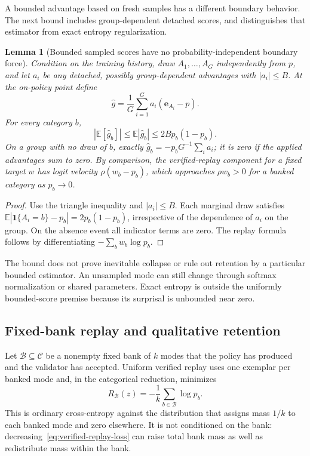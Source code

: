\documentclass{article}
\newcommand{\1}{\mathbf 1}
\newcommand{\E}{\mathbb E}
\newtheorem{lemma}{Lemma}[section]
\theoremstyle{remark}
\theoremstyle{definition}
\theoremstyle{plain}
\begin{document}
A bounded advantage based on fresh samples has a different boundary behavior.
The next bound includes group-dependent detached scores, and distinguishes
that estimator from exact entropy regularization.

\begin{lemma}[Bounded sampled scores have no probability-independent boundary force]
\label{lem:sampled-score-bound}
Condition on the training history, draw $A_1,\ldots,A_G$ independently from
$p$, and let $a_i$ be any detached, possibly group-dependent advantages with
$|a_i|\le B$. At the on-policy point define
\[
 \widehat g=\frac1G\sum_{i=1}^G a_i(\mathbf e_{A_i}-p).
\]
For every category $b$,
\[
 |\E[\widehat g_b]|\le\E|\widehat g_b|
 \le 2B p_b(1-p_b).
\]
On a group with no draw of $b$, exactly
$\widehat g_b=-p_bG^{-1}\sum_i a_i$; it is zero if the applied advantages
sum to zero. By comparison, the verified-replay component for a fixed target
$w$ has logit velocity $\rho(w_b-p_b)$, which approaches $\rho w_b>0$
for a banked category as $p_b\to0$.
\end{lemma}

\begin{proof}
Use the triangle inequality and $|a_i|\le B$. Each marginal draw satisfies
$\E|\1\{A_i=b\}-p_b|=2p_b(1-p_b)$, irrespective of the dependence of
$a_i$ on the group. On the absence event all indicator terms are zero.
The replay formula follows by differentiating $-\sum_b w_b\log p_b$.
\end{proof}

The bound does not prove inevitable collapse or rule out retention by a
particular bounded estimator. An unsampled mode can still change through
softmax normalization or shared parameters. Exact entropy is outside the
uniformly bounded-score premise because its surprisal is unbounded near zero.

\subsection{Fixed-bank replay and qualitative retention}
\label{app:theory-replay}

Let $\mathcal B\subseteq\mathcal C$ be a nonempty fixed bank of $k$ modes that
the policy has produced and the validator has accepted. Uniform verified replay
uses one exemplar per banked mode and, in the categorical reduction, minimizes
\begin{equation}
  R_{\mathcal B}(z)
  =-\frac1k\sum_{b\in\mathcal B}\log p_b.
  \label{eq:verified-replay-loss}
\end{equation}
This is ordinary cross-entropy against the distribution that assigns mass
$1/k$ to each banked mode and zero elsewhere. It is not conditioned on the
bank: decreasing~\eqref{eq:verified-replay-loss} can raise total bank mass as
well as redistribute mass within the bank.
\end{document}
